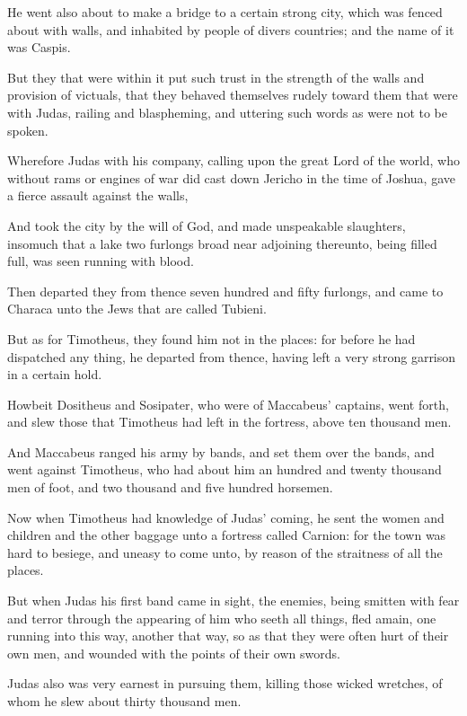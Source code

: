 {\par }{\PP {}He went also about to make a bridge to a certain strong city, which was fenced about with walls, and inhabited by people of divers countries; and the name of it was Caspis.
\par }{\PP {}But they that were within it put such trust in the strength of the walls and provision of victuals, that they behaved themselves rudely toward them that were with Judas, railing and blaspheming, and uttering such words as were not to be spoken.
\par }{\PP {}Wherefore Judas with his company, calling upon the great Lord of the world, who without rams or engines of war did cast down Jericho in the time of Joshua, gave a fierce assault against the walls,
\par }{\PP {}And took the city by the will of God, and made unspeakable slaughters, insomuch that a lake two furlongs broad near adjoining thereunto, being filled full, was seen running with blood.
\par }{\PP {}Then departed they from thence seven hundred and fifty furlongs, and came to Characa unto the Jews that are called Tubieni.
\par }{\PP {}But as for Timotheus, they found him not in the places: for before he had dispatched any thing, he departed from thence, having left a very strong garrison in a certain hold.
\par }{\PP {}Howbeit Dositheus and Sosipater, who were of Maccabeus’ captains, went forth, and slew those that Timotheus had left in the fortress, above ten thousand men.
\par }{\PP {}And Maccabeus ranged his army by bands, and set them over the bands, and went against Timotheus, who had about him an hundred and twenty thousand men of foot, and two thousand and five hundred horsemen.
\par }{\PP {}Now when Timotheus had knowledge of Judas’ coming, he sent the women and children and the other baggage unto a fortress called Carnion: for the town was hard to besiege, and uneasy to come unto, by reason of the straitness of all the places.
\par }{\PP {}But when Judas his first band came in sight, the enemies, being smitten with fear and terror through the appearing of him who seeth all things, fled amain, one running into this way, another that way, so as that they were often hurt of their own men, and wounded with the points of their own swords.
\par }{\PP {}Judas also was very earnest in pursuing them, killing those wicked wretches, of whom he slew about thirty thousand men.
}
